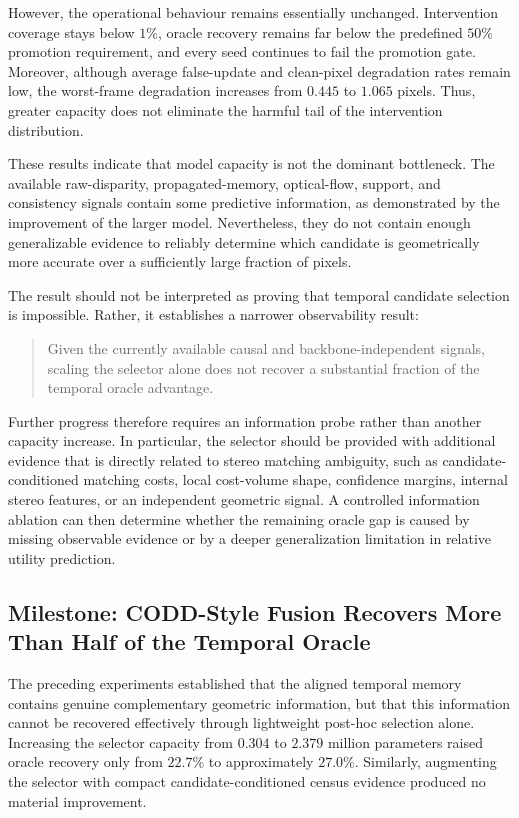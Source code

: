 \documentclass[11pt,a4paper]{article}
\begin{document}
However, the operational behaviour remains essentially unchanged. Intervention coverage
stays below \(1\%\), oracle recovery remains far below the predefined \(50\%\) promotion
requirement, and every seed continues to fail the promotion gate. Moreover, although
average false-update and clean-pixel degradation rates remain low, the worst-frame
degradation increases from \(0.445\) to \(1.065\) pixels. Thus, greater capacity does not
eliminate the harmful tail of the intervention distribution.

These results indicate that model capacity is not the dominant bottleneck. The available
raw-disparity, propagated-memory, optical-flow, support, and consistency signals contain
some predictive information, as demonstrated by the improvement of the larger model.
Nevertheless, they do not contain enough generalizable evidence to reliably determine
which candidate is geometrically more accurate over a sufficiently large fraction of
pixels.

The result should not be interpreted as proving that temporal candidate selection is
impossible. Rather, it establishes a narrower observability result:

\begin{quote}
Given the currently available causal and backbone-independent signals, scaling the
selector alone does not recover a substantial fraction of the temporal oracle advantage.
\end{quote}

Further progress therefore requires an information probe rather than another capacity
increase. In particular, the selector should be provided with additional evidence that
is directly related to stereo matching ambiguity, such as candidate-conditioned matching
costs, local cost-volume shape, confidence margins, internal stereo features, or an
independent geometric signal. A controlled information ablation can then determine
whether the remaining oracle gap is caused by missing observable evidence or by a deeper
generalization limitation in relative utility prediction.


\subsection{Milestone: CODD-Style Fusion Recovers More Than Half of the Temporal Oracle}
\label{sec:codd_style_milestone}

The preceding experiments established that the aligned temporal memory contains genuine
complementary geometric information, but that this information cannot be recovered
effectively through lightweight post-hoc selection alone. Increasing the selector capacity
from \(0.304\) to \(2.379\) million parameters raised oracle recovery only from
\(22.7\%\) to approximately \(27.0\%\). Similarly, augmenting the selector with compact
candidate-conditioned census evidence produced no material improvement.
\end{document}
